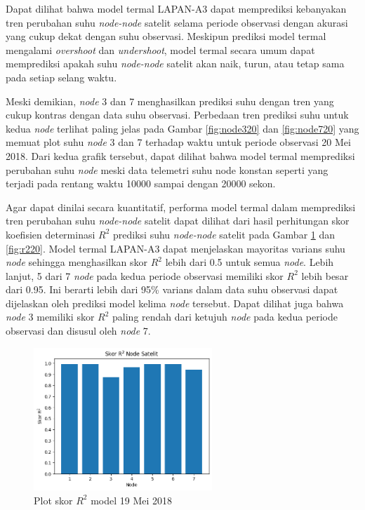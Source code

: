 Dapat dilihat bahwa model termal LAPAN-A3 dapat memprediksi kebanyakan tren
perubahan suhu \textit{node-node} satelit selama periode observasi dengan akurasi yang
cukup dekat dengan suhu observasi. Meskipun prediksi model termal mengalami
\textit{overshoot} dan \textit{undershoot}, model termal secara umum dapat
memprediksi apakah suhu \textit{node-node} satelit akan naik, turun, atau tetap sama
pada setiap selang waktu.

Meski demikian, \textit{node} 3 dan 7 menghasilkan prediksi suhu
dengan tren yang cukup kontras dengan data suhu observasi. Perbedaan tren
prediksi suhu untuk kedua \textit{node} terlihat paling jelas pada Gambar \ref{fig:node320}
dan \ref{fig:node720} yang memuat plot suhu \textit{node} 3 dan 7 terhadap waktu untuk
periode observasi 20 Mei 2018. Dari kedua grafik tersebut, dapat dilihat bahwa
model termal memprediksi perubahan suhu \textit{node} meski data telemetri suhu node
konstan seperti yang terjadi pada rentang waktu 10000 sampai dengan 20000
sekon.

Agar dapat dinilai secara kuantitatif, performa model termal dalam memprediksi
tren perubahan suhu \textit{node-node} satelit dapat dilihat dari hasil perhitungan skor koefisien determinasi $R^2$ prediksi suhu \textit{node-node} satelit pada Gambar \ref{fig:r219} dan
\ref{fig:r220}. Model termal LAPAN-A3 dapat menjelaskan mayoritas varians suhu
\textit{node} sehingga menghasilkan skor $R^2$ lebih dari 0.5 untuk semua \textit{node}. Lebih
lanjut, 5 dari 7 \textit{node} pada kedua periode observasi memiliki skor $R^2$ lebih besar dari 0.95. Ini berarti lebih dari 95\%
varians dalam data suhu observasi dapat dijelaskan oleh prediksi model kelima \textit{node} tersebut. Dapat
dilihat juga bahwa \textit{node} 3 memiliki skor $R^2$ paling rendah dari ketujuh \textit{node} pada
kedua periode observasi dan disusul oleh \textit{node} 7.

\begin{figure}[H]
\setlength{}
\begin{center}
\includegraphics[width=0.6\textwidth]{fig/r2_2018-05-19.png}
\caption{Plot skor $R^2$ model 19 Mei 2018}
\label{fig:r219}
\end{center}
\end{figure}

